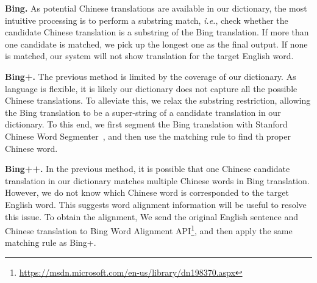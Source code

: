 \begin{CJK}{UTF8}{gbsn}
{\bf Bing.} As potential Chinese translations are available in our dictionary, the most intuitive processing is to perform a substring match, {\it i.e.}, check whether the candidate Chinese translation is a substring of the Bing translation. If more than one candidate is matched, we pick up the longest one as the final output. If none is matched, our system will not show translation for the target English word.



{\bf Bing+.} The previous method is limited by the coverage of our dictionary. As language is flexible, it is likely our dictionary does not capture all the possible Chinese translations. To alleviate this, we relax the substring restriction, allowing the Bing translation to be a super-string of a candidate translation in our dictionary. To this end, we first segment the Bing translation with Stanford Chinese Word Segmenter~\cite{Chang2008}, and then use the matching rule to find th proper Chinese word. 


{\bf Bing++.} In the previous method, it is possible that one Chinese candidate translation in our dictionary matches multiple Chinese words in Bing translation. However, we do not know which Chinese word is corresponded to the target English word. This suggests word alignment information will be useful to resolve this issue. To obtain the alignment, We send the original English sentence and Chinese translation to Bing Word Alignment API\footnote{\url{https://msdn.microsoft.com/en-us/library/dn198370.aspx}}, and then apply the same matching rule as Bing+.



\end{CJK}
